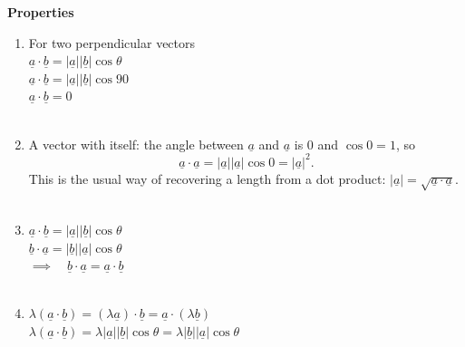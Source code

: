 \documentclass[11pt,a4paper]{article}
\theoremstyle{definition}
\begin{document}
\textbf{Properties}
\begin{enumerate}
\item For two perpendicular vectors\\


$\underline{a}\cdot \underline{b} = \left|\underline{a}\right| \left|\underline{b}\right|\cos \theta$\\

$\underline{a}\cdot \underline{b} = \left|\underline{a}\right| \left|\underline{b}\right|\cos 90$\\


$\underline{a}\cdot \underline{b} = 0$\\\\




\item A vector with itself: the angle between $\underline{a}$ and $\underline{a}$
is $0$ and $\cos 0=1$, so
$$\underline{a}\cdot\underline{a}
=\left|\underline{a}\right|\left|\underline{a}\right|\cos 0
=\left|\underline{a}\right|^{2}.$$
This is the usual way of recovering a length from a dot product:
$\left|\underline{a}\right|=\sqrt{\underline{a}\cdot\underline{a}}$.\\\\



\item $\underline{a}\cdot \underline{b} = \left|\underline{a}\right| \left|\underline{b}\right|\cos \theta$\\

$\underline{b}\cdot \underline{a} = \left|\underline{b}\right| \left|\underline{a}\right|\cos \theta$\\

$ \implies\quad  \underline{b}\cdot\underline{a} = \underline{a}\cdot \underline{b}$\\\\ 



\item $\lambda \left(\underline{a}\cdot\underline{b}\right) = \left(\lambda \underline{a}\right)\cdot \underline{b} = \underline{a}\cdot\left(\lambda \underline{b}\right)$\\
 
$\lambda \left( \underline{a}\cdot \underline{b}\right) = \lambda \left|\underline{a}\right| \left|\underline{b}\right|\cos \theta = \lambda\left|\underline{b}\right| \left|\underline{a}\right|\cos \theta$\\\\




\end{enumerate}
\end{document}
